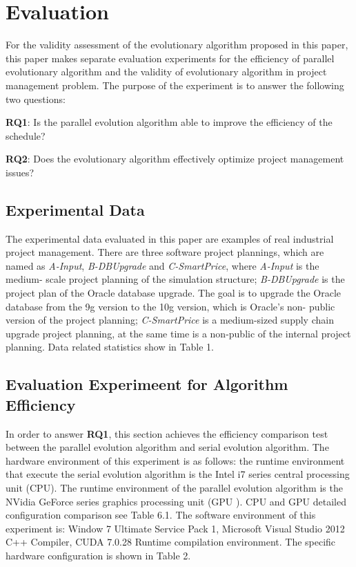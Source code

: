 \section{Evaluation}
%
For the validity assessment of the evolutionary algorithm proposed in
this paper, this paper makes separate evaluation experiments for the
efficiency of parallel evolutionary algorithm and the validity of
evolutionary algorithm in project management problem. The purpose of
the experiment is to answer the following two questions:

\textbf{RQ1}: Is the parallel evolution algorithm able to improve the efficiency of 
the schedule?

\textbf{RQ2}: Does the evolutionary algorithm effectively optimize project management 
issues?

\subsection{Experimental Data}
%
The experimental data evaluated in this paper are examples of real
industrial project management. There are three software project
plannings, which are named as \emph{A-Input}, \emph{B-DBUpgrade} and
\emph{C-SmartPrice}, where \emph{A-Input} is the medium- scale project
planning of the simulation structure; \emph{B-DBUpgrade} is the
project plan of the Oracle database upgrade. The goal is to upgrade
the Oracle database from the 9g version to the 10g version, which is
Oracle's non- public version of the project planning;
\emph{C-SmartPrice} is a medium-sized supply chain upgrade project
planning, at the same time is a non-public of the internal project
planning\cite{ren}. Data related statistics show in Table 1.


\subsection{Evaluation Experimeent for Algorithm Efficiency}
%

In order to answer \textbf{RQ1}, this section achieves the efficiency
comparison test between the parallel evolution algorithm and serial
evolution algorithm. The hardware environment of this experiment is as
follows: the runtime environment that execute the serial evolution
algorithm is the Intel i7 series central processing unit (CPU). The
runtime environment of the parallel evolution algorithm is the NVidia
GeForce series graphics processing unit (GPU ). CPU and GPU detailed
configuration comparison see Table 6.1. The software environment of
this experiment is: Window 7 Ultimate Service Pack 1, Microsoft Visual
Studio 2012 C++ Compiler, CUDA 7.0.28 Runtime compilation
environment. The specific hardware configuration is shown in Table 2.

